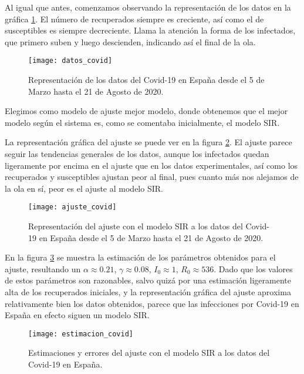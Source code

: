 Al igual que antes, comenzamos observando la representación de los datos en la gráfica \ref{datos_covid}. El número de recuperados siempre es creciente, así como el de susceptibles es siempre decreciente. Llama la atención la forma de los infectados, que primero suben y luego descienden, indicando así el final de la ola.

\begin{figure}
\begin{center}
\caption{Representación de los datos del Covid-19 en España desde el 5 de Marzo hasta el 21 de Agosto de 2020.}
\label{datos_covid}
\texttt{[image: datos\_covid]}
\end{center}
\end{figure}

Elegimos como modelo de ajuste mejor modelo, donde obtenemos que el mejor modelo según el sistema es, como se comentaba inicialmente, el modelo SIR.

La representación gráfica del ajuste se puede ver en la figura \ref{ajuste_covid}. El ajuste parece seguir las tendencias generales de los datos, aunque los infectados quedan ligeramente por encima en el ajuste que en los datos experimentales, así como los recuperados y susceptibles ajustan peor al final, pues cuanto más nos alejamos de la ola en sí, peor es el ajuste al modelo SIR.

\begin{figure}
\begin{center}
\caption{Representación del ajuste con el modelo SIR a los datos del Covid-19 en España desde el 5 de Marzo hasta el 21 de Agosto de 2020.}
\label{ajuste_covid}
\texttt{[image: ajuste\_covid]}
\end{center}
\end{figure}

En la figura \ref{estimacion_covid} se muestra la estimación de los parámetros obtenidos para el ajuste, resultando un $\alpha \approx 0.21$, $\gamma \approx 0.08$, $I_0 \approx 1$, $R_0 \approx 536$. Dado que los valores de estos parámetros son razonables, salvo quizá por una estimación ligeramente alta de los recuperados iniciales, y la representación gráfica del ajuste aproxima relativamente bien los datos obtenidos, parece que las infecciones por Covid-19 en España en efecto siguen un modelo SIR.

\begin{figure}
\begin{center}
\caption{Estimaciones y errores del ajuste con el modelo SIR a los datos del Covid-19 en España.}
\label{estimacion_covid}
\texttt{[image: estimacion\_covid]}
\end{center}
\end{figure}











